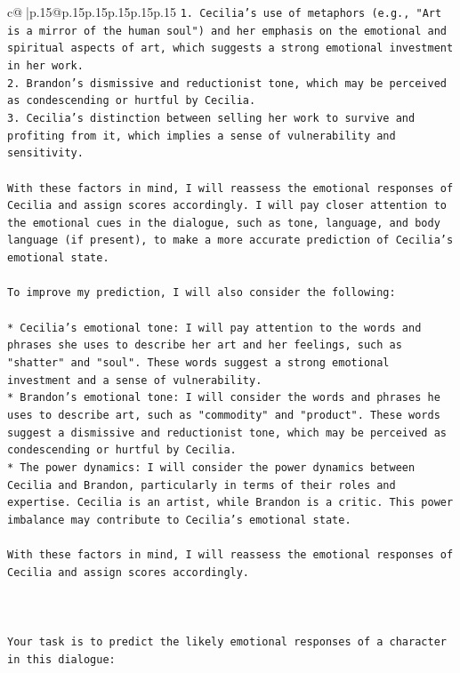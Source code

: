 \documentclass{article}
\begin{document}
{\begin{supertabular}{c@{$\;$}|p{.15\linewidth}@{}p{.15\linewidth}p{.15\linewidth}p{.15\linewidth}p{.15\linewidth}p{.15\linewidth}}
{{{\texttt{1. Cecilia's use of metaphors (e.g., "Art is a mirror of the human soul") and her emphasis on the emotional and spiritual aspects of art, which suggests a strong emotional investment in her work.} \\
\texttt{2. Brandon's dismissive and reductionist tone, which may be perceived as condescending or hurtful by Cecilia.} \\
\texttt{3. Cecilia's distinction between selling her work to survive and profiting from it, which implies a sense of vulnerability and sensitivity.} \\
\\ 
\texttt{With these factors in mind, I will reassess the emotional responses of Cecilia and assign scores accordingly. I will pay closer attention to the emotional cues in the dialogue, such as tone, language, and body language (if present), to make a more accurate prediction of Cecilia's emotional state.} \\
\\ 
\texttt{To improve my prediction, I will also consider the following:} \\
\\ 
\texttt{* Cecilia's emotional tone: I will pay attention to the words and phrases she uses to describe her art and her feelings, such as "shatter" and "soul". These words suggest a strong emotional investment and a sense of vulnerability.} \\
\texttt{* Brandon's emotional tone: I will consider the words and phrases he uses to describe art, such as "commodity" and "product". These words suggest a dismissive and reductionist tone, which may be perceived as condescending or hurtful by Cecilia.} \\
\texttt{* The power dynamics: I will consider the power dynamics between Cecilia and Brandon, particularly in terms of their roles and expertise. Cecilia is an artist, while Brandon is a critic. This power imbalance may contribute to Cecilia's emotional state.} \\
\\ 
\texttt{With these factors in mind, I will reassess the emotional responses of Cecilia and assign scores accordingly.} \\
\\ 
\\ 
\\ 
\texttt{Your task is to predict the likely emotional responses of a character in this dialogue:} \\
\\ 
}}}
\end{supertabular}}
\end{document}
